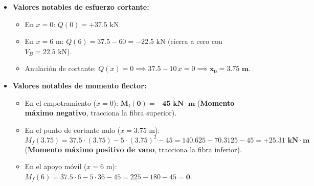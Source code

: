 {    \begin{itemize}
        \item \textbf{Valores notables de esfuerzo cortante:}
              \begin{itemize}
                  \item En $x = 0$: $Q(0) = +37.5\text{ kN}$.
                  \item En $x = 6\text{ m}$: $Q(6) = 37.5 - 60 = -22.5\text{ kN}$ (cierra a cero con $V_B = 22.5\text{ kN}$).
                  \item Anulación de cortante: $Q(x) = 0 \implies 37.5 - 10\,x = 0 \implies \mathbf{x_0 = 3.75\text{ m}}$.
              \end{itemize}
        \item \textbf{Valores notables de momento flector:}
              \begin{itemize}
                  \item En el empotramiento ($x = 0$): $\mathbf{M_f(0) = -45\text{ kN}\cdot\text{m}}$ (\textbf{Momento máximo negativo}, tracciona la fibra superior).
                  \item En el punto de cortante nulo ($x = 3.75\text{ m}$):
                        \begin{equation}
                            M_f(3.75) = 37.5 \cdot (3.75) - 5 \cdot (3.75)^2 - 45 = 140.625 - 70.3125 - 45 = \mathbf{+25.31\text{ kN}\cdot\text{m}}
                        \end{equation}
                        (\textbf{Momento máximo positivo de vano}, tracciona la fibra inferior).
                  \item En el apoyo móvil ($x = 6\text{ m}$): $M_f(6) = 37.5 \cdot 6 - 5 \cdot 36 - 45 = 225 - 180 - 45 = \mathbf{0}$.
              \end{itemize}
    \end{itemize}

    \begin{center}
\end{center}}
